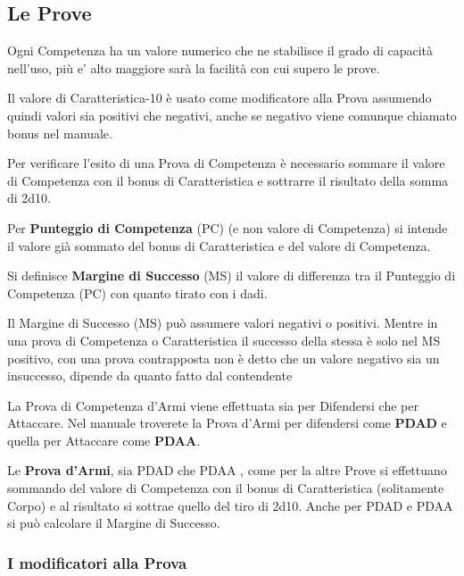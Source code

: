 \documentclass[12pt,a4paper,twoside,openany]{book}
\begin{document}
\begin{multicols}{2}
	
\subsection{Le Prove}

Ogni Competenza ha un valore numerico che ne stabilisce il grado di capacità nell'uso, più e' alto maggiore sarà la facilità con cui supero le prove.

Il valore di Caratteristica-10 è usato come modificatore alla Prova assumendo quindi valori sia positivi che negativi, anche se negativo viene comunque chiamato bonus nel manuale.

Per verificare l'esito di una Prova di Competenza è necessario sommare il valore di Competenza con il bonus di Caratteristica e sottrarre il risultato della somma di 2d10.

Per \textbf{Punteggio di Competenza} (PC) (e non valore di Competenza) si intende il valore già sommato del bonus di Caratteristica e del valore di Competenza.

Si definisce \textbf{Margine di Successo} (MS) il valore di differenza tra il Punteggio di Competenza (PC) con quanto tirato con i dadi.

Il Margine di Successo (MS) può assumere valori negativi o positivi. Mentre in una prova di Competenza o Caratteristica il successo della stessa è solo nel MS positivo, con una prova contrapposta non è detto che un valore negativo sia un insuccesso, dipende da quanto fatto dal contendente

La Prova di Competenza d'Armi viene effettuata sia per Difendersi che per Attaccare. Nel manuale troverete la Prova d'Armi per difendersi come \textbf{PDAD} e quella per Attaccare come \textbf{PDAA}.
 
Le \textbf{Prova d'Armi}, sia PDAD che PDAA , come per la altre Prove si effettuano sommando del valore di Competenza con il bonus di Caratteristica (solitamente Corpo) e al risultato si sottrae quello del tiro di 2d10.
Anche per PDAD e PDAA si può calcolare il Margine di Successo.

\subsubsection{I modificatori alla Prova}


\end{multicols}
\end{document}
